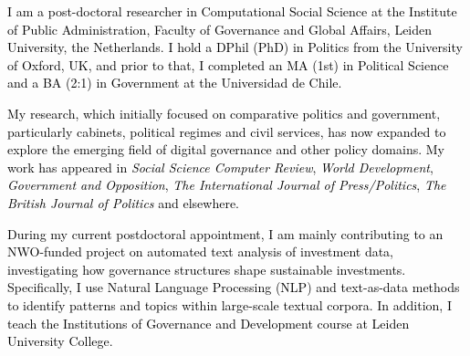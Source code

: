 




\vspace{3mm}

\begin{cvparagraph}

\textcolor{black}{I am a post-doctoral researcher in Computational Social Science at the Institute of Public Administration, Faculty of Governance and Global Affairs, Leiden University, the Netherlands. I hold a DPhil (PhD) in Politics from the University of Oxford, UK, and prior to that, I completed an MA (1st) in Political Science and a BA (2:1) in Government at the Universidad de Chile.}

\textcolor{black}{My research, which initially focused on comparative politics and government, particularly cabinets, political regimes and civil services, has now expanded to explore the emerging field of digital governance and other policy domains. My work has appeared in {\itshape Social Science Computer Review}, {\itshape World Development}, {\itshape Government and Opposition}, {\itshape The International Journal of Press/Politics}, {\itshape The British Journal of Politics} and elsewhere.}

\textcolor{black}{During my current postdoctoral appointment, I am mainly contributing to an NWO-funded project on automated text analysis of investment data, investigating how governance structures shape sustainable investments. Specifically, I use Natural Language Processing (NLP) and text-as-data methods to identify patterns and topics within large-scale textual corpora. In addition, I teach the Institutions of Governance and Development course at Leiden University College.}
\vspace{1mm}
\end{cvparagraph}
